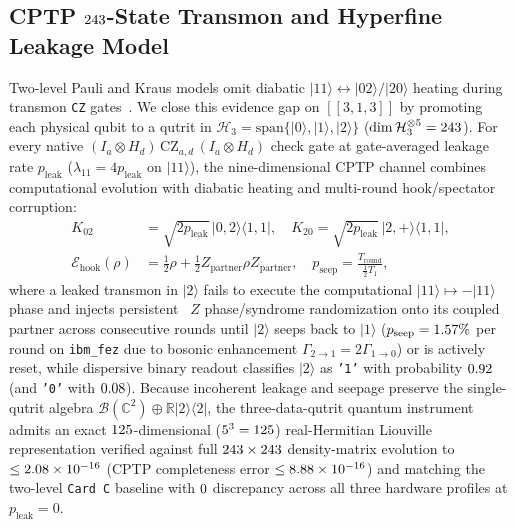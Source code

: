 \documentclass[aps,prx,twocolumn,superscriptaddress,nofootinbib]{revtex4-2}
\begin{document}
\subsection{CPTP $243$-State Transmon and Hyperfine Leakage Model}
Two-level Pauli and Kraus models omit diabatic $|11\rangle \leftrightarrow |02\rangle / |20\rangle$ heating during transmon \texttt{CZ} gates~\cite{WoodGambetta2018,MiaoLeakage2023,MarquesLRU2023}. We close this evidence gap on $[[3,1,3]]$ by promoting each physical qubit to a qutrit in $\mathcal{H}_3 = \mathrm{span}\{|0\rangle,|1\rangle,|2\rangle\}$ ($\dim \mathcal{H}_3^{\otimes 5} = 243$). For every native $(I_a \otimes H_d)\,\mathrm{CZ}_{a,d}\,(I_a \otimes H_d)$ check gate at gate-averaged leakage rate $p_{\mathrm{leak}}$ ($\lambda_{11} = 4 p_{\mathrm{leak}}$ on $|11\rangle$), the nine-dimensional CPTP channel combines computational evolution with diabatic heating and multi-round hook/spectator corruption:
\begin{align}
  K_{02} &= \sqrt{2 p_{\mathrm{leak}}}\,|0,2\rangle\langle 1,1|, \quad
  K_{20} = \sqrt{2 p_{\mathrm{leak}}}\,|2,+\rangle\langle 1,1|, \nonumber\\
  \mathcal{E}_{\mathrm{hook}}(\rho) &= \tfrac{1}{2}\rho + \tfrac{1}{2} Z_{\mathrm{partner}}\rho Z_{\mathrm{partner}}, \quad
  p_{\mathrm{seep}} = \frac{T_{\mathrm{round}}}{\tfrac{1}{2} T_1},
  \label{eq:qutrit_kraus}
\end{align}
where a leaked transmon in $|2\rangle$ fails to execute the computational $|11\rangle \mapsto -|11\rangle$ phase and injects persistent \ecqHookPhaseProbPct\ $Z$ phase/syndrome randomization onto its coupled partner across consecutive rounds until $|2\rangle$ seeps back to $|1\rangle$ ($p_{\mathrm{seep}} = 1.57\%$ per round on \texttt{ibm\_fez} due to bosonic enhancement $\Gamma_{2\to 1} = 2\Gamma_{1\to 0}$) or is actively reset, while dispersive binary readout classifies $|2\rangle$ as \texttt{'1'} with probability $0.92$ (and \texttt{'0'} with $0.08$). Because incoherent leakage and seepage preserve the single-qutrit algebra $\mathcal{B}(\mathbb{C}^2) \oplus \mathbb{R}|2\rangle\langle 2|$, the three-data-qutrit quantum instrument admits an exact $125$-dimensional ($5^3 = 125$) real-Hermitian Liouville representation verified against full $243 \times 243$ density-matrix evolution to $\le 2.08 \times 10^{-16}$ (CPTP completeness error $\le 8.88 \times 10^{-16}$) and matching the two-level \texttt{Card C} baseline with $0$ discrepancy across all three hardware profiles at $p_{\mathrm{leak}} = 0$.
\end{document}
